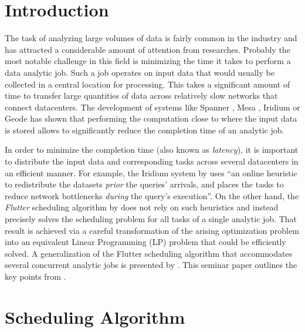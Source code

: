 
\theoremstyle{definition}
\newtheorem{definition}{Definition}[section]

\theoremstyle{definition}
\newtheorem{optimization}{Optimization Problem}

\section{Introduction}

The task of analyzing large volumes of data is fairly common in the industry and has attracted a considerable amount of attention from researches. Probably the most notable challenge in this field is minimizing the time it takes to perform a data analytic job. Such a job operates on input data that would usually be collected in a central location for processing. This takes a significant amount of time to transfer large quantities of data across relatively slow networks that connect datacenters. The development of systems like Spanner \cite{Corbett2012}, Mesa \cite{Gupta2014}, Iridium \cite{Pu2015} or Geode \cite{Vulimiri2015} has shown that performing the computation close to where the input data is stored allows to significantly reduce the completion time of an analytic job.

In order to minimize the completion time (also known as \emph{latency}), it is important to distribute the input data and corresponding tasks across several datacenters in an efficient manner. For example, the Iridium system by \citet{Pu2015} uses ``an online heuristic to redistribute the datasets \emph{prior} the queries' arrivals, and places the tasks to reduce network bottlenecks \emph{during} the query's execution''. On the other hand, the \emph{Flutter} scheduling algorithm by \citet{Hu2016} does not rely on such heuristics and instead precisely solves the scheduling problem for all tasks of a single analytic job. That result is achieved via a careful transformation of the arising optimization problem into an equivalent Linear Programming (LP) problem that could be efficiently solved. A generalization of the Flutter scheduling algorithm that accommodates several concurrent analytic jobs is presented by \citet{Chen2017}. This seminar paper outlines the key points from \cite{Chen2017}.

\section{Scheduling Algorithm}

